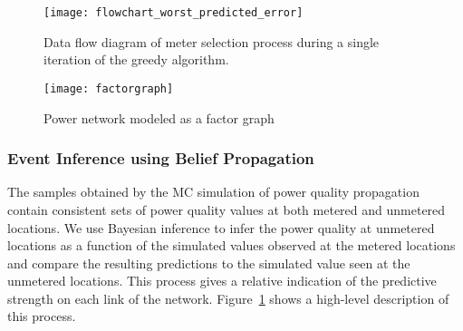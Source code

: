 \begin{figure}[!p]
\vspace{1cm}
\centering
\texttt{[image: flowchart\_worst\_predicted\_error]}
\vspace{0.5cm}
\caption{Data flow diagram of meter selection process during a single iteration of the greedy algorithm.}
\label{flowchart}
\end{figure}

\begin{figure}[!p]
\centering
\texttt{[image: factorgraph]}
\vspace{0.5cm}
\caption{Power network modeled as a factor graph}
\label{factorgraph}
\vspace{2cm}
\end{figure}

\subsubsection{Event Inference using Belief Propagation}
The samples obtained by the MC simulation of power quality propagation contain consistent sets of power quality values at both metered and unmetered locations. We use Bayesian inference to infer the power quality at unmetered locations as a function of the  simulated values observed at the metered locations and compare the resulting predictions to the simulated value seen at the unmetered locations. This process gives a relative indication of the predictive strength on each link of the network. Figure~\ref{flowchart} shows a high-level description of this process.

